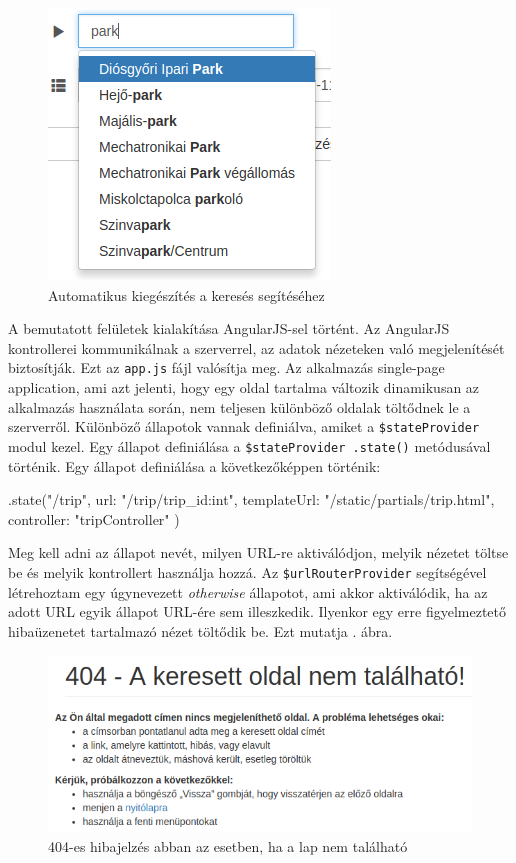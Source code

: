 \begin{figure}[h!]
\centering
\includegraphics[scale=0.6]{kepek/autocomplete.png}
\caption{Automatikus kiegészítés a keresés segítéséhez}
\label{fig:autocomplete}
\end{figure}


A bemutatott felületek kialakítása AngularJS-sel történt. Az AngularJS kontrollerei kommunikálnak a szerverrel, az adatok nézeteken való megjelenítését biztosítják. Ezt az \texttt{app.js} fájl valósítja meg.
Az alkalmazás single-page application, ami azt jelenti, hogy egy oldal tartalma változik dinamikusan az alkalmazás használata során, nem teljesen különböző oldalak töltődnek le a szerverről. Különböző állapotok vannak definiálva, amiket a \texttt{\$stateProvider} modul kezel. Egy állapot definiálása a \texttt{\$stateProvider .state()} metódusával történik.
Egy állapot definiálása a következőképpen történik:
\begin{cpp}
.state("/trip", {
            url: "/trip/{trip_id:int}",
            templateUrl: "/static/partials/trip.html",
            controller: "tripController"
        })
\end{cpp}
Meg kell adni az állapot nevét, milyen URL-re aktiválódjon, melyik nézetet töltse be és melyik kontrollert használja hozzá.
Az \texttt{\$urlRouterProvider} segítségével létrehoztam egy úgynevezett \textit{otherwise} állapotot, ami akkor aktiválódik, ha az adott URL egyik állapot URL-ére sem illeszkedik. Ilyenkor egy erre figyelmeztető hibaüzenetet tartalmazó nézet töltődik be. Ezt mutatja . ábra.

\begin{figure}[h!]
\centering
\includegraphics[scale=0.7]{kepek/404.png}
\caption{404-es hibajelzés abban az esetben, ha a lap nem található}
\label{fig:404}
\end{figure}

